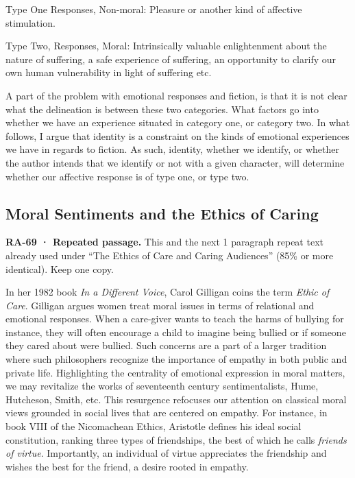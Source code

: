\documentclass[
  letterpaper,
  DIV=11,
  numbers=noendperiod]{scrartcl}
\theoremstyle{remark}
\begin{document}
Type One Responses, Non-moral: Pleasure or another kind of affective
stimulation.

Type Two, Responses, Moral: Intrinsically valuable enlightenment about
the nature of suffering, a safe experience of suffering, an opportunity
to clarify our own human vulnerability in light of suffering etc.

A part of the problem with emotional responses and fiction, is that it
is not clear what the delineation is between these two categories. What
factors go into whether we have an experience situated in category one,
or category two. In what follows, I argue that identity is a constraint
on the kinds of emotional experiences we have in regards to fiction. As
such, identity, whether we identify, or whether the author intends that
we identify or not with a given character, will determine whether our
affective response is of type one, or type two.

\subsection{Moral Sentiments and the Ethics of
Caring}\label{moral-sentiments-and-the-ethics-of-caring}

\begin{tcolorbox}[enhanced jigsaw, arc=.35mm, bottomrule=.15mm, bottomtitle=1mm, breakable, colback=white, colbacktitle=quarto-callout-important-color!10!white, colframe=quarto-callout-important-color-frame, coltitle=black, left=2mm, leftrule=.75mm, opacityback=0, opacitybacktitle=0.6, rightrule=.15mm, title=\textcolor{quarto-callout-important-color}{\faExclamation}\hspace{0.5em}{Important}, titlerule=0mm, toprule=.15mm, toptitle=1mm]

\textbf{RA-69 · Repeated passage.} This and the next 1 paragraph repeat
text already used under ``The Ethics of Care and Caring Audiences''
(85\% or more identical). Keep one copy.

\end{tcolorbox}

In her 1982 book \emph{In a Different Voice}, Carol Gilligan coins the
term \emph{Ethic of Care}. Gilligan argues women treat moral issues in
terms of relational and emotional responses. When a care-giver wants to
teach the harms of bullying for instance, they will often encourage a
child to imagine being bullied or if someone they cared about were
bullied. Such concerns are a part of a larger tradition where such
philosophers recognize the importance of empathy in both public and
private life. Highlighting the centrality of emotional expression in
moral matters, we may revitalize the works of seventeenth century
sentimentalists, Hume, Hutcheson, Smith, etc. This resurgence refocuses
our attention on classical moral views grounded in social lives that are
centered on empathy. For instance, in book VIII of the Nicomachean
Ethics, Aristotle defines his ideal social constitution, ranking three
types of friendships, the best of which he calls \emph{friends of
virtue}. Importantly, an individual of virtue appreciates the friendship
and wishes the best for the friend, a desire rooted in empathy.
\end{document}
